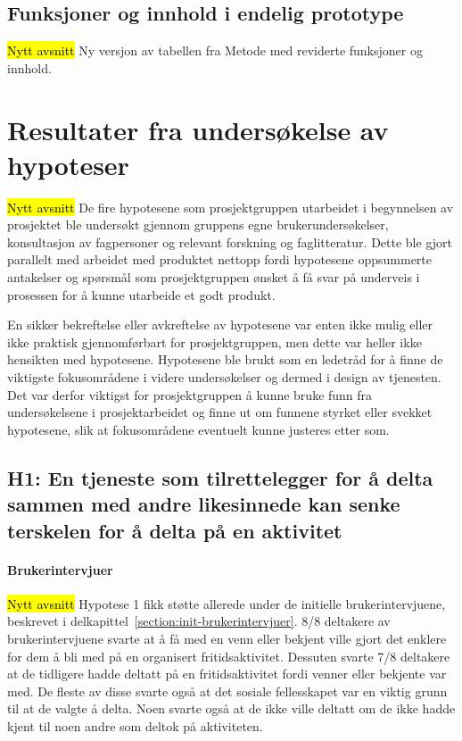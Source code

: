 \subsection{Funksjoner og innhold i endelig prototype}
\hl{Nytt avsnitt}
Ny versjon av tabellen fra Metode med reviderte funksjoner og innhold.

\section{Resultater fra undersøkelse av hypoteser}
\hl{Nytt avsnitt}
De fire hypotesene som prosjektgruppen utarbeidet i begynnelsen av prosjektet ble undersøkt gjennom gruppens egne brukerundersøkelser, konsultasjon av fagpersoner og relevant forskning og faglitteratur. Dette ble gjort parallelt med arbeidet med produktet nettopp fordi hypotesene oppsummerte antakelser og spørsmål som prosjektgruppen ønsket å få svar på underveis i prosessen for å kunne utarbeide et godt produkt.

En sikker bekreftelse eller avkreftelse av hypotesene var enten ikke mulig eller ikke praktisk gjennomførbart for prosjektgruppen, men dette var heller ikke hensikten med hypotesene. Hypotesene ble brukt som en ledetråd for å finne de viktigste fokusområdene i videre undersøkelser og dermed i design av tjenesten. Det var derfor viktigst for prosjektgruppen å kunne bruke funn fra undersøkelsene i prosjektarbeidet og finne ut om funnene styrket eller svekket hypotesene, slik at fokusområdene eventuelt kunne justeres etter som.

\subsection{H1: En tjeneste som tilrettelegger for å delta sammen med andre likesinnede kan senke terskelen for å delta på en aktivitet}

\paragraph{Brukerintervjuer}
\hl{Nytt avsnitt}
Hypotese 1 fikk støtte allerede under de initielle brukerintervjuene, beskrevet i delkapittel~\ref{section:init-brukerintervjuer}. 8/8 deltakere av brukerintervjuene svarte at å få med en venn eller bekjent ville gjort det enklere for dem å bli med på en organisert fritidsaktivitet. Dessuten svarte 7/8 deltakere at de tidligere hadde deltatt på en fritidsaktivitet fordi venner eller bekjente var med. De fleste av disse svarte også at det sosiale fellesskapet var en viktig grunn til at de valgte å delta. Noen svarte også at de ikke ville deltatt om de ikke hadde kjent til noen andre som deltok på aktiviteten.

